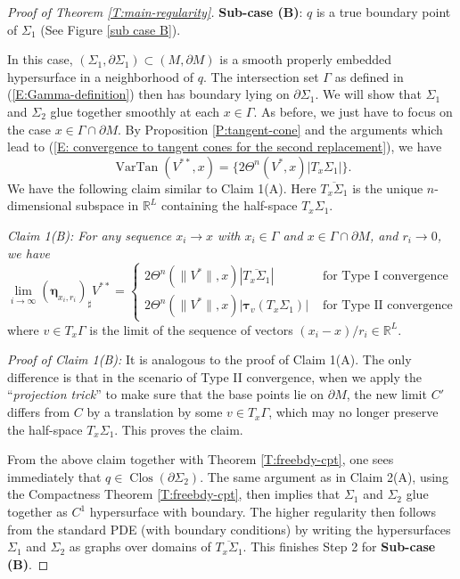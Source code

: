 \documentclass[10pt]{amsart}
\theoremstyle{definition}
\theoremstyle{remark}
\numberwithin{equation}{section}
\newcommand{\R}{\mathbb{R}}
\newcommand{\Si}{\Sigma}
\newcommand{\Ga}{\Gamma}
\newcommand{\btau}{\boldsymbol \tau}
\newcommand{\bleta}{\boldsymbol \eta}
\newcommand{\VarTan}{\operatorname{VarTan}}
\newcommand{\Clos}{\operatorname{Clos}}
\begin{document}
\begin{proof}[Proof of Theorem \ref{T:main-regularity}]
\textbf{Sub-case (B)}: $q$ is a true boundary point of $\Sigma_1$ (See Figure \ref{sub case B}).

\vspace{.3cm}

In this case, $(\Sigma_1,\partial \Sigma_1) \subset (M,\partial M)$ is a smooth properly embedded hypersurface in a neighborhood of $q$. The intersection set $\Gamma$ as defined in (\ref{E:Gamma-definition}) then has boundary lying on $\partial \Sigma_1$. We will show that $\Sigma_1$ and $\Sigma_2$ glue together smoothly at each $x \in \Gamma$. As before, we just have to focus on the case $x \in \Ga \cap \partial M$. By Proposition \ref{P:tangent-cone} and the arguments which lead to (\ref{E: convergence to tangent cones for the second replacement}), we have
\[ \VarTan(V^{**},x)=\{2 \Theta^n(V^*,x) |T_x \Sigma_1|\}. \]
We have the following claim similar to Claim 1(A). Here $\overline{T_x\Si_1}$ is the unique $n$-dimensional subspace in $\R^L$ containing the half-space $T_x\Si_1$.

\vspace{.3cm}


\textit{Claim 1(B): For any sequence $x_i \to x$ with $x_i \in \Gamma$ and $x \in \Gamma\cap\partial M$, and $r_i\to 0$, we have}
\[ \lim_{i \to \infty} (\bleta_{x_i,r_i})_\sharp V^{**} =\left\{ \begin{array}{cl}
2\Theta^n(\|V^*\|,x) |\overline{T_x \Sigma_1}| & \text{ for Type I convergence} \\
2\Theta^n(\|V^*\|,x) |\btau_v(T_x \Sigma_1)| & \text{ for Type II convergence} \end{array} \right. \]
where $v \in T_x \Gamma$ is the limit of the sequence of vectors $(x_i-x)/r_i \in \R^L$.


\textit{Proof of Claim 1(B):} It is analogous to the proof of Claim 1(A). The only difference is that in the scenario of Type II convergence, when we apply the ``\emph{projection trick}'' to make sure that the base points lie on $\partial M$, the new limit $C'$ differs from $C$ by a translation by some $v \in T_x \Ga$, which may no longer preserve the half-space $T_x \Si_1$. This proves the claim.


From the above claim together with Theorem \ref{T:freebdy-cpt}, one sees immediately that $q \in \Clos(\partial \Sigma_2)$. The same argument as in Claim 2(A), using the Compactness Theorem \ref{T:freebdy-cpt}, then implies that $\Sigma_1$ and $\Sigma_2$ glue together as $C^1$ hypersurface with boundary. The higher regularity then follows from the standard PDE (with boundary conditions) by writing the hypersurfaces $\Sigma_1$ and $\Sigma_2$ as graphs over domains of $\overline{T_x \Si_1}$. This finishes Step 2 for \textbf{Sub-case (B)}.





\end{proof}
\end{document}
